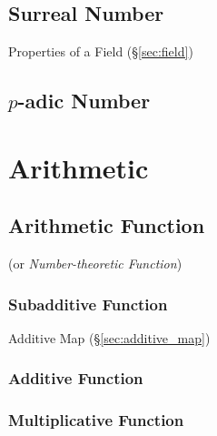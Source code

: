 \subsection{Surreal Number}\label{sec:surreal_number}

Properties of a Field (\S\ref{sec:field})



\subsection{$p$-adic Number}\label{sec:padic_number}



\section{Arithmetic}\label{sec:arithmetic}

\subsection{Arithmetic Function}\label{sec:arithmetic_function}

(or \emph{Number-theoretic Function})



\subsubsection{Subadditive Function}\label{sec:subadditive_function}

Additive Map (\S\ref{sec:additive_map})



\subsubsection{Additive Function}\label{sec:additive_function}

\subsubsection{Multiplicative Function}
\label{sec:multiplicative_function}

